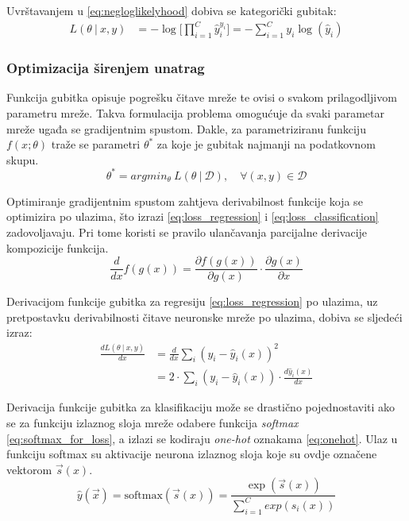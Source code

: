 \documentclass[times, utf8, numeric, diplomski]{fer}
\def\pfrac#1#2{\frac{\partial #1}{\partial #2}}
\def\dfrac#1#2{\frac{d #1}{d #2}}
\def\probsep{\ |\ }
\def\dataset{\mathcal{D}}
\begin{document}
Uvrštavanjem u \ref{eq:negloglikelyhood} dobiva se kategorički gubitak:
\begin{align}
\label{eq:loss_classification}
L(\theta \probsep x,y) &= - \log \Big[ \prod_{i=1}^C \hat{y}_i^{y_i} \Big] = - \sum_{i=1}^C y_i \log (\hat{y}_i)
\end{align}

\subsubsection{Optimizacija širenjem unatrag}
\label{sec:backprop}
Funkcija gubitka opisuje pogrešku čitave mreže te ovisi o svakom prilagodljivom parametru mreže. Takva formulacija problema omogućuje da svaki parametar mreže ugađa se gradijentnim spustom. Dakle, za parametriziranu funkciju $f(x;\theta)$ traže se parametri $\theta^*$ za koje je gubitak najmanji na podatkovnom skupu.
\begin{equation}
\theta^* = argmin_\theta\ L(\theta \probsep \dataset), \quad \forall (x,y) \in \dataset
\end{equation}

Optimiranje gradijentnim spustom zahtjeva derivabilnost funkcije koja se optimizira po ulazima, što izrazi \eqref{eq:loss_regression} i \eqref{eq:loss_classification} zadovoljavaju. Pri tome koristi se pravilo ulančavanja parcijalne derivacije kompozicije funkcija.
\begin{equation}
\label{eq:partial_rule}
\dfrac{}{x} f(g(x)) = \pfrac{f(g(x))}{g(x)} \cdot \pfrac{g(x)}{x}
\end{equation}

Derivacijom funkcije gubitka za regresiju \eqref{eq:loss_regression} po ulazima, uz pretpostavku derivabilnosti čitave neuronske mreže po ulazima, dobiva se sljedeći izraz:
\begin{align}
\dfrac{L(\theta \probsep x,y)}{x} &= \dfrac{}{x}\sum_i(y_i - \hat{y}_i(x))^2 \nonumber \\
&= 2 \cdot \sum_i (y_i - \hat{y}_i(x)) \cdot \dfrac{\hat{y}_i(x)}{x}
\end{align}

Derivacija funkcije gubitka za klasifikaciju može se drastično pojednostaviti ako se za funkciju izlaznog sloja mreže odabere funkcija \textit{softmax} \eqref{eq:softmax_for_loss}, a izlazi se kodiraju \textit{one-hot} oznakama \eqref{eq:onehot}. Ulaz u funkciju softmax su aktivacije neurona izlaznog sloja koje su ovdje označene vektorom $\vec{s}(x)$.
\begin{equation}
\label{eq:softmax_for_loss}
\hat{y}(\vec{x}) = \text{softmax}(\vec{s}(x)) = \frac{\exp(\vec{s}(x))}{\sum_{i=1}^{C} exp(s_i(x))}
\end{equation}
\end{document}
